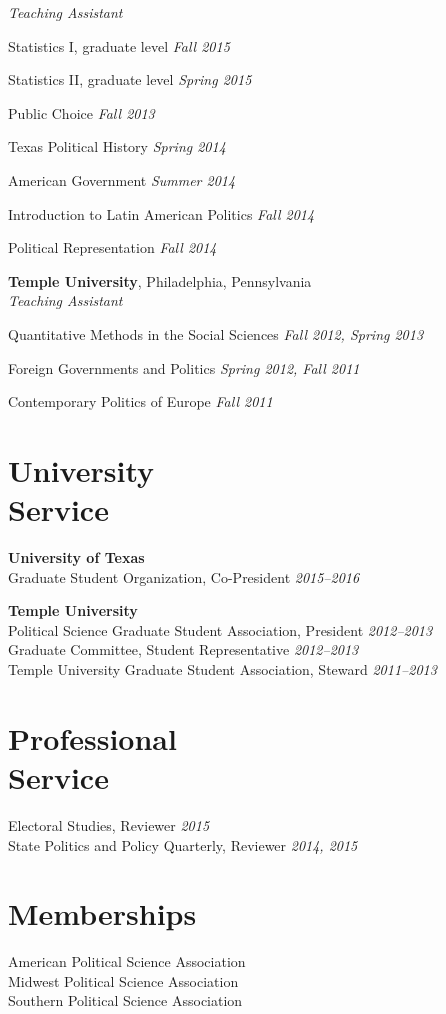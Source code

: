 \documentclass[margin,line]{res}
\newenvironment{list2}{
    \begin{list}{--}{%
        \setlength{\itemsep}{0in}
        \setlength{\parsep}{0in} \setlength{\parskip}{0in}
        \setlength{\topsep}{0in} \setlength{\partopsep}{0in}
        \setlength{\leftmargin}{0.2in}}}{\end{list}}
\begin{document}
\begin{resume}
\emph{Teaching Assistant} 
\begin{list2}
\item Statistics I, graduate level \hfill \emph{Fall 2015}
\item Statistics II, graduate level \hfill \emph{Spring 2015}
\item Public Choice \hfill \emph{Fall 2013}
\item Texas Political History \hfill \emph{Spring 2014}
\item American Government \hfill \emph{Summer 2014}
\item Introduction to Latin American Politics \hfill \emph{Fall 2014}
\item Political Representation \hfill \emph{Fall 2014}
\end{list2}

\textbf{Temple University}, Philadelphia, Pennsylvania  \\
\emph{Teaching Assistant}

\begin{list2}
\item Quantitative Methods in the Social Sciences \hfill \emph{Fall 2012, Spring 2013}
\item Foreign Governments and Politics \hfill \emph{Spring 2012, Fall 2011}
\item Contemporary Politics of Europe \hfill \emph{Fall 2011}
\end{list2}

\section{\sc University \\Service}
\textbf{University of Texas} \\
Graduate Student Organization, Co-President \hfill \emph{2015--2016} %

\textbf{Temple University}\\
Political Science Graduate Student Association, President \hfill \emph{2012--2013} \\
Graduate Committee, Student Representative \hfill \emph{2012--2013} \\
Temple University Graduate Student Association, Steward \hfill \emph{2011--2013} %

\section{\sc Professional \\Service}
Electoral Studies, Reviewer \hfill \emph{2015}\\
State Politics and Policy Quarterly, Reviewer \hfill \emph{2014, 2015} \\

\section{\sc Memberships}
American Political Science Association \\
Midwest Political Science Association \\
Southern Political Science Association \\


\end{resume}
\end{document}
